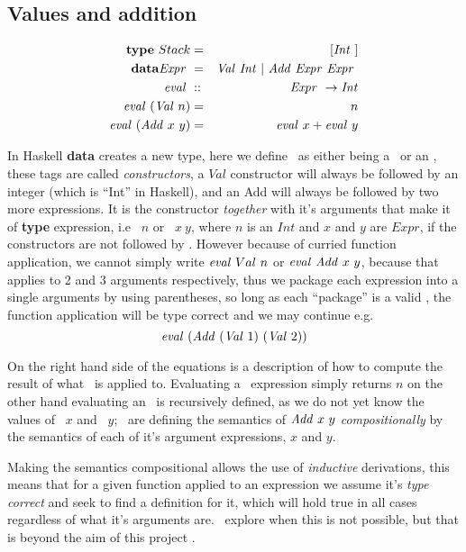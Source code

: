 \documentclass {article}
\begin{document}
\subsection{Values and addition}

\begin{eqnarray}
\textbf{type} \ Stack &=& [\mathit{Int\ }] \nonumber \\
\textbf{data} \mathit{Expr\ } &=& \mathit{Val\ } \mathit{Int\ } | \ \mathit{Add\ } \mathit{Expr\ } \mathit{Expr\ } \nonumber \\
\mathit{eval\ } &::& \mathit{Expr\ } \rightarrow \mathit{Int} \nonumber \\ 
\mathit{eval\ } (\mathit{Val\ }  n) &=& n \label{evalval}\\
\mathit{eval\ } (\mathit{Add\ }  x\  y) &=& \mathit{eval\ }  x + \mathit{eval\ }  y \label{evaladd}
\end{eqnarray}

In Haskell \textbf{data} creates a new type,
here we define \expr\ as either being a \val\
or an \add, these tags are called \emph{constructors},
a $Val$ constructor will always be followed by an integer
(which is ``Int'' in Haskell),
and an Add will always be followed by two more expressions.
It is the constructor \emph{together} with 
it's arguments that make it of \textbf{type}
expression, i.e \val\ $n$ or \add\ $x\ y$,
where $n$ is an $Int$ and $x$ and $y$ are $Expr$,
if the constructors are not followed by .
However because of curried function application,
we cannot simply write 
$\mathit{eval\ }  Val\ n$ or $\mathit{eval\ }  \mathit{Add\ } x\ y$,
because that applies \eval to 2 and 3 arguments respectively,
thus we package each expression into a single arguments
by using parentheses, so long as each ``package'' is a
valid \expr, the function application will be type correct
and we may continue e.g.
\[ \mathit{eval\ } (\mathit{Add\ } (\mathit{Val\ } 1)\ (\mathit{Val\ } 2)) \]

On the right hand side of the equations is a
description of how to compute 
the result of what \eval\ is applied to.
Evaluating a \val\ expression simply returns $n$
on the other hand evaluating an \add\
is recursively defined, as we do not yet know
the values of \eval\ $x$ and  \eval\ $y$; \BH\ are defining the
semantics of $\Add x\ y$ \emph{compositionally} by the 
semantics of each of it's argument expressions, $x$ and $y$.

Making the semantics compositional allows
the use of \textit{inductive} derivations,
this means that for a given 
function applied to an expression
we assume it's \textit{type correct} and seek to find
a definition for it, which will hold true in
all cases regardless of what it's arguments are.
\BH\ explore
when this is not possible, but that is beyond
the aim of this project \cite{bandh}.
\end{document}
